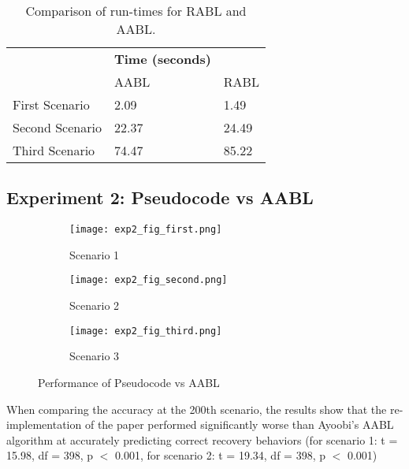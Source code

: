 \documentclass{article}
\begin{document}
\begin{table}[H]
\caption{Comparison of run-times for RABL and AABL.}
\label{tab:refac-time-mem}
\centering
\begin{tabular}{l|ll|}
\cline{2-3}
\textbf{}                             & \textbf{Time (seconds)}    & \textbf{} \\ \cline{2-3} 
                                      & \multicolumn{1}{l|}{AABL}  & RABL      \\ \hline
\multicolumn{1}{|l|}{First Scenario}  & \multicolumn{1}{l|}{2.09}  & 1.49      \\ \hline
\multicolumn{1}{|l|}{Second Scenario} & \multicolumn{1}{l|}{22.37} & 24.49     \\ \hline
\multicolumn{1}{|l|}{Third Scenario}  & \multicolumn{1}{l|}{74.47} & 85.22     \\ \hline
\end{tabular}
\end{table}


\subsection{Experiment 2: Pseudocode vs AABL}
\begin{figure}[H]
    \centering
    \begin{subfigure}[b]{0.45\textwidth}
        \texttt{[image: exp2\_fig\_first.png]}
        \caption{Scenario 1}
    \end{subfigure}
    \begin{subfigure}[b]{0.45\textwidth}
        \texttt{[image: exp2\_fig\_second.png]}
        \caption{Scenario 2}
    \end{subfigure}
    \begin{subfigure}[b]{0.45\textwidth}
        \texttt{[image: exp2\_fig\_third.png]}
        \caption{Scenario 3}
    \end{subfigure}
    \caption{Performance of Pseudocode vs AABL}
    \label{fig:refactored-comparison.png}
\end{figure}
When comparing the accuracy at the 200th scenario, the results show that the re-implementation of the paper performed significantly worse than Ayoobi's AABL algorithm at accurately predicting correct recovery behaviors (for scenario 1: t = 15.98, df = 398, p $<$ 0.001, for scenario 2: t = 19.34, df = 398, p $<$ 0.001) 
\end{document}
